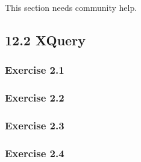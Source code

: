 \documentclass[../../main.tex]{subfiles}
\begin{document}
This section needs community help.

\subsection{12.2 XQuery}

\subsubsection*{Exercise 2.1}

\subsubsection*{Exercise 2.2}

\subsubsection*{Exercise 2.3}

\subsubsection*{Exercise 2.4}
\end{document}
